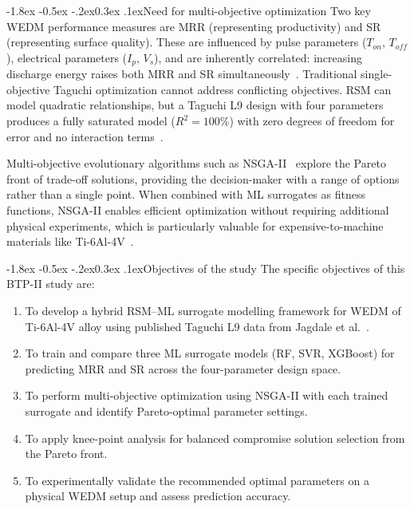 \documentclass[12pt, a4paper]{report}
\makeatletter
\renewcommand{\section}{\@startsection{section}{1}{\z@}%
  {-1.8ex \@plus -0.5ex \@minus -.2ex}{0.3ex \@plus.1ex}{\normalfont\bfseries}}
\makeatother
\begin{document}
\section{Need for multi-objective optimization}
Two key WEDM performance measures are MRR (representing productivity) and SR (representing surface quality). These are influenced by pulse parameters ($T_{on}$, $T_{off}$), electrical parameters ($I_p$, $V_s$), and are inherently correlated: increasing discharge energy raises both MRR and SR simultaneously~\cite{Jagdale2025, Ukey2023}. Traditional single-objective Taguchi optimization cannot address conflicting objectives. RSM can model quadratic relationships, but a Taguchi L9 design with four parameters produces a fully saturated model ($R^2 = 100\%$) with zero degrees of freedom for error and no interaction terms~\cite{Montgomery2020}.

Multi-objective evolutionary algorithms such as NSGA-II~\cite{Deb2002} explore the Pareto front of trade-off solutions, providing the decision-maker with a range of options rather than a single point. When combined with ML surrogates as fitness functions, NSGA-II enables efficient optimization without requiring additional physical experiments, which is particularly valuable for expensive-to-machine materials like Ti-6Al-4V~\cite{SurrogateEDM2024, BBDNSGA2024}.

\section{Objectives of the study}
The specific objectives of this BTP-II study are:
\begin{enumerate}[noitemsep, topsep=2pt]
    \item To develop a hybrid RSM--ML surrogate modelling framework for WEDM of Ti-6Al-4V alloy using published Taguchi L9 data from Jagdale et al.~\cite{Jagdale2025}.
    \item To train and compare three ML surrogate models (RF, SVR, XGBoost) for predicting MRR and SR across the four-parameter design space.
    \item To perform multi-objective optimization using NSGA-II with each trained surrogate and identify Pareto-optimal parameter settings.
    \item To apply knee-point analysis for balanced compromise solution selection from the Pareto front.
    \item To experimentally validate the recommended optimal parameters on a physical WEDM setup and assess prediction accuracy.
\end{enumerate}
\end{document}
